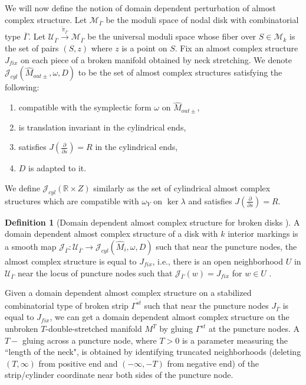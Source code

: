 \documentclass[11pt, oneside,dvipsnames]{amsart}
\renewcommand{\to}{\rightarrow}
\newcommand{\wt}{\widetilde}
\renewcommand{\to}{\rightarrow}
\newcommand{\<}{\langle}
\renewcommand{\>}{\rangle}
\newcommand{\bR}{\mathbb{R}}
\newcommand{\cJ}{\mathcal{J}}
\newcommand{\cM}{\mathcal{M}}
\renewcommand{\to}{\rightarrow}
\newcommand{\dd}[1]{\frac{\partial}{\partial #1}}
\theoremstyle{definition}
\theoremstyle{definition}
\newtheorem{defn}[Theorem]{Definition}
\numberwithin{equation}{subsection}
\begin{document}
We will now define the notion of domain dependent perturbation of almost complex structure. Let $\cM_{\overline{\Gamma}}$  be the moduli space of nodal disk with combinatorial type $\overline{\Gamma}$. Let $\mathcal{U}_{\overline{\Gamma}} \xrightarrow{\wt\pi_{\overline{\Gamma}}} \cM_{\overline{\Gamma}}$ be the universal moduli space whose fiber over $S\in \cM_{k}$ is the set of pairs $(S,z)$ where $z$ is a point on $S$.  Fix an almost complex structure $ J_{fix}$ on each piece of a broken manifold obtained by neck stretching.  We denote $\mathcal{J}_{cyl}(\widehat M_{out\pm},\omega,D)$ to be the set of almost complex structures satisfying the following:
\begin{enumerate}
    \item compatible with the symplectic form $\omega$ on $\widehat M_{out\pm}$,
    \item is translation invariant in the cylindrical ends,
    \item satisfies $J(\dd{s}) = R$ in the cylindrical ends,
    \item $D$ is adapted to it.
\end{enumerate} 

We define $\cJ_{cyl}(\bR \times Z)$ similarly as the set of cylindrical almost complex structures which are compatible with $\omega_Y$ on $\ker \lambda$ and satisfies $J(\dd{s})=R$.

\begin{defn}[Domain dependent almost complex structure for broken disks ]\label{def:domdepstruc}
A domain dependent almost complex structure of a disk with $k$ interior markings is a smooth map $\mathcal{J}_{\overline{\Gamma}}: \mathcal{U}_{\overline{\Gamma}} \to \mathcal{J}_{cyl}(\widehat M_i,\omega,D)$ such that near the puncture nodes, the almost complex structure is equal to $J_{fix}$, i.e., there is an open neighborhood $U$ in $\mathcal{U}_{\overline{\Gamma}}$ near the locus of puncture nodes such that  $\mathcal{J}_{\overline{\Gamma}} (w) = J_{fix}$ for $w\in U$ . 
\end{defn}

Given a domain dependent almost complex structure on a stabilized combinatorial type of broken strip $\overline {\Gamma^{st}}$ such that near the puncture nodes $J_{\overline{\Gamma}}$ is equal to $J_{fix}$, we can get a domain dependent almost complex structure on the unbroken  $T$-double-stretched manifold $M^T$ by gluing $\Gamma^{st}$ at the puncture nodes. A $T - $ gluing across a puncture node, where $T>0$ is a parameter measuring the ``length of the neck", is obtained by identifying truncated neighborhoods (deleting $(T,\infty)$ from positive end and $(-\infty,-T)$ from negative end) of the strip/cylinder coordinate near both sides of the puncture node.
\end{document}
